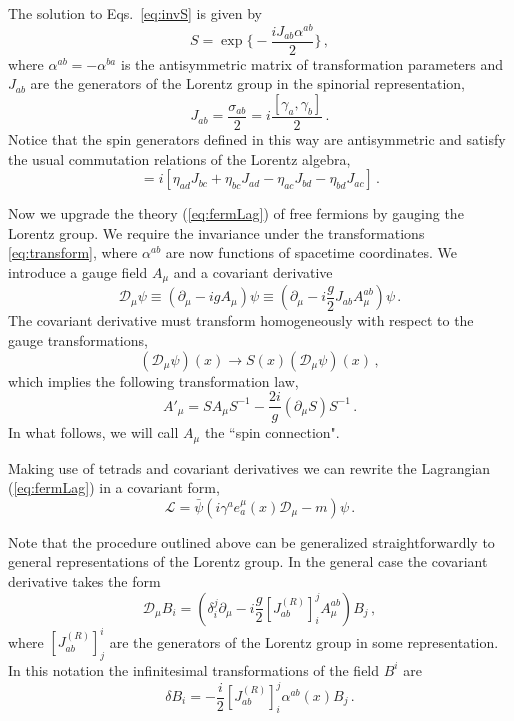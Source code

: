 \documentclass[12pt]{article}
\newcommand{\be}{\begin{equation}}
\newcommand{\ee}{\end{equation}}
\newcommand\m{\mu}
\newcommand\D{\Delta}
\def\d{\partial}
\renewcommand{\D}{\mathcal{D}}
\begin{document}
The solution to Eqs.~\eqref{eq:invS} is given by
\be
\label{eq:transform}
S=\exp\Big\{-\frac{iJ_{ab}\alpha^{ab}}{2}\Big\} \,,
\ee
where $\alpha^{ab}=-\alpha^{ba}$ is the antisymmetric matrix of transformation parameters
and $J_{ab}$ are the generators of the Lorentz group in the spinorial representation,
\be
J_{ab}= \frac{\sigma_{ab}}{2}=i\frac{[\gamma_a,\gamma_b]}{2}\,.
\ee
Notice that the spin generators defined in this way are antisymmetric and satisfy the usual commutation relations of the Lorentz algebra,
\be
[J_{ab},J_{cd}]=i\left[\eta_{ad}J_{bc}+\eta_{bc}J_{ad}
-\eta_{ac}J_{bd}-\eta_{bd}J_{ac}\right]\,.
\ee

Now we upgrade the theory (\ref{eq:fermLag}) of free fermions by gauging the Lorentz group. We require the invariance under the transformations \eqref{eq:transform}, where $\alpha^{ab}$ are now functions of spacetime coordinates.
We introduce a gauge field $A_\mu$ and a covariant derivative
\be
\label{eq:covarphi}
\D_\mu \psi\equiv(\d_\mu-ig A_\m)\psi\equiv (\d_\mu-i\frac{g}{2} J_{ab}A^{ab}_\m)\psi\,.
\ee
The covariant derivative must transform homogeneously with respect to the gauge transformations,
\be
(\D_\m \psi) (x)\to S(x) (\D_\m \psi) (x)\,,
\ee
which implies the following transformation law,
\be
A'_\m=S A_\m S^{-1}-\frac{2i}{g}(\d_\mu S)S^{-1}\,.
\ee
In what follows, we will call $A_\mu$ the ``spin connection".


Making use of tetrads and covariant derivatives we can rewrite the Lagrangian (\ref{eq:fermLag}) in a covariant form,
\be
\label{eq:lagr}
\mathcal{L}=\bar \psi (i\gamma^a e^{\m}_a(x)\D_\mu -m)\psi \,.
\ee

Note that the procedure outlined above can be generalized straightforwardly to general representations of the Lorentz group. In the general case the covariant derivative takes the form
\be
\D_\mu B_{i}=(\delta^j_i \d_\mu -i\frac{g}{2} [J^{(R)}_{ab}]^j_i A^{ab}_\m)B_j\,,
\ee
where $[J^{(R)}_{ab}]^i_j$ are the generators of the Lorentz group in some representation. In this notation
the infinitesimal transformations of the field $B^i$ are
\be
\delta B_i=-\frac{i}{2}[J^{(R)}_{ab}]^j_i\alpha^{ab}(x)B_j \,.
\ee
\end{document}
